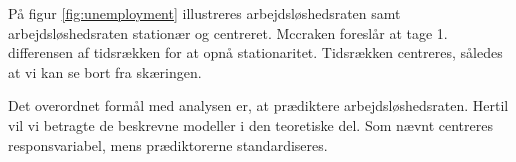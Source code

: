 På figur \ref{fig:unemployment} illustreres arbejdsløshedsraten samt arbejdsløshedsraten stationær og centreret.
Mccraken foreslår at tage 1. differensen af tidsrækken for at opnå stationaritet.
Tidsrækken centreres, således at vi kan se bort fra skæringen.
%

Det overordnet formål med analysen er, at prædiktere arbejdsløshedsraten.
Hertil vil vi betragte de beskrevne modeller i den teoretiske del.
Som nævnt centreres responsvariabel, mens prædiktorerne standardiseres.